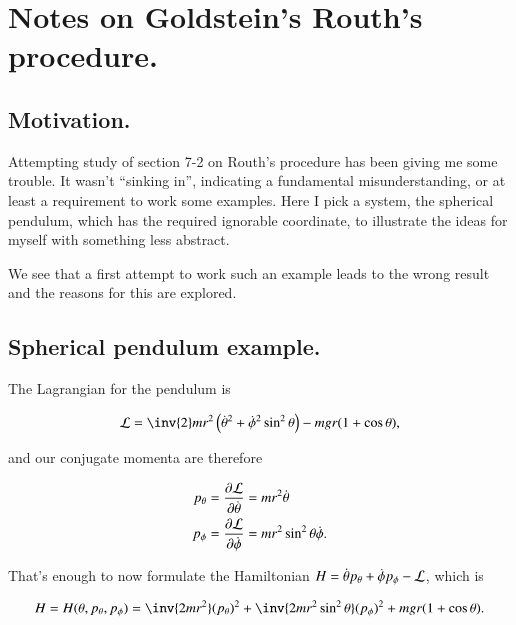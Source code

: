 %
%

\chapter{Notes on Goldstein's Routh's procedure.}
\label{chap:goldsteinRouth}
{}
\date{Mar 3, 2010}

\beginArtNoToc

\section{Motivation.}

Attempting study of \cite{goldstein1951cm} section 7-2 on Routh's procedure has been giving me some trouble.  It wasn't ``sinking in'', indicating a fundamental misunderstanding, or at least a requirement to work some examples.  Here I pick a system, the spherical pendulum, which has the required ignorable coordinate, to illustrate the ideas for myself with something less abstract.

We see that a first attempt to work such an example leads to the wrong result and the reasons for this are explored.

\section{Spherical pendulum example.}

The Lagrangian for the pendulum is

\begin{align}\label{eqn:goldsteinRouth:1}
\LL = \inv{2} m r^2 \left( \dot{\theta}^2 + \dot{\phi}^2 \sin^2 \theta \right) - m g r ( 1 + \cos\theta ),
\end{align}

and our conjugate momenta are therefore

\begin{align}\label{eqn:goldsteinRouth:2}
p_\theta &= \frac{\partial {\mathcal{L}}}{\partial {\dot{\theta}}} = m r^2 \dot{\theta} \\
p_\phi &= \frac{\partial {\mathcal{L}}}{\partial {\dot{\phi}}} = m r^2 \sin^2\theta \dot{\phi}.
\end{align}

That's enough to now formulate the Hamiltonian $H = \dot{\theta} p_\theta + \dot{\phi} p_\phi - \mathcal{L}$, which is

\begin{align}\label{eqn:goldsteinRouth:3}
H = H(\theta, p_\theta, p_\phi) = \inv{2 m r^2 } (p_\theta)^2 + \inv{2 m r^2 \sin^2\theta} (p_\phi)^2 + m g r ( 1 + \cos\theta ).
\end{align}

